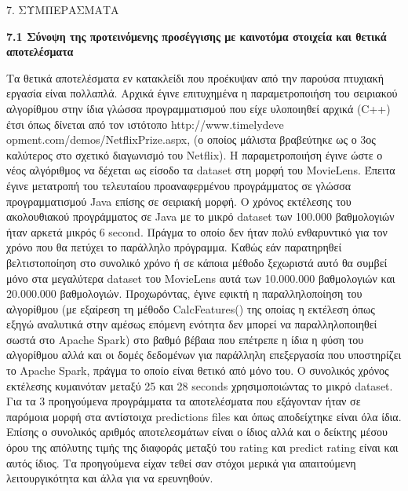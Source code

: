 \documentclass{report}
\begin{document}
{\vspace{20mm} 

\newpage

\begin{center}
\LARGE{7. ΣΥΜΠΕΡΑΣΜΑΤΑ}
\end{center}

\vspace{5mm}

\textbf{\large{7.1 Σύνοψη της προτεινόμενης προσέγγισης με καινοτόμα στοιχεία και θετικά αποτελέσματα }}

\vspace{2mm} 

Τα θετικά αποτελέσματα εν κατακλείδι που προέκυψαν από την παρούσα πτυχιακή εργασία είναι πολλαπλά. Αρχικά έγινε επιτυχημένα η παραμετροποιήση του σειριακού αλγορίθμου στην ίδια γλώσσα προγραμματισμού που είχε υλοποιηθεί αρχικά (\textlatin{C++}) έτσι όπως δίνεται από τον ιστότοπο \textlatin{http://www.timelydeve} \textlatin{opment.com/demos/NetflixPrize.aspx}, (ο οποίος μάλιστα βραβεύτηκε ως ο 3ος καλύτερος στο σχετικό διαγωνισμό του \textlatin{Netflix}). Η παραμετροποιήση έγινε ώστε ο νέος αλγόριθμος να δέχεται ως είσοδο τα \textlatin{dataset} στη μορφή του \textlatin{MovieLens}. Έπειτα έγινε μετατροπή του τελευταίου προαναφερμένου προγράμματος σε γλώσσα προγραμματισμού \textlatin{Java} επίσης σε σειριακή μορφή. Ο χρόνος εκτέλεσης του ακολουθιακού προγράμματος σε \textlatin{Java} με το μικρό \textlatin{dataset} των 100.000 βαθμολογιών ήταν αρκετά μικρός 6 \textlatin{second}. Πράγμα το οποίο δεν ήταν πολύ ενθαρυντικό για τον χρόνο που θα πετύχει το παράλληλο πρόγραμμα. Καθώς εάν παρατηρηθεί βελτιστοποίηση στο συνολικό χρόνο ή σε κάποια μέθοδο ξεχωριστά αυτό θα συμβεί μόνο στα μεγαλύτερα \textlatin{dataset} του \textlatin{MovieLens} αυτά των 10.000.000 βαθμολογιών και 20.000.000 βαθμολογιών. Προχωρόντας, έγινε εφικτή η παραλληλοποίηση του αλγορίθμου (με εξαίρεση τη μέθοδο \textlatin{CalcFeatures}() της οποίας η εκτέλεση όπως εξηγώ αναλυτικά στην αμέσως επόμενη ενότητα δεν μπορεί να παραλληλοποιηθεί σωστά στο \textlatin{Apache Spark})  στο βαθμό βέβαια που επέτρεπε η ίδια η φύση του αλγορίθμου αλλά και οι δομές δεδομένων για παράλληλη επεξεργασία που υποστηρίζει το \textlatin{Apache Spark}, πράγμα το οποίο είναι θετικό από μόνο του. Ο συνολικός χρόνος εκτέλεσης κυμαινόταν μεταξύ 25 και 28 \textlatin{seconds} χρησιμοποιώντας το μικρό \textlatin{dataset}. Για τα 3 προηγούμενα προγράμματα τα αποτελέσματα που εξάγονταν ήταν σε παρόμοια μορφή στα αντίστοιχα \textlatin{predictions files} και όπως αποδείχτηκε είναι όλα ίδια. Επίσης ο συνολικός αριθμός αποτελεσμάτων είναι ο ίδιος αλλά και ο δείκτης μέσου όρου της απόλυτης τιμής της διαφοράς μεταξύ του \textlatin{rating} και \textlatin{predict rating} είναι και αυτός ίδιος. Τα προηγούμενα είχαν τεθεί σαν στόχοι μερικά για απαιτούμενη λειτουργικότητα και άλλα για να ερευνηθούν.


}
\end{document}
